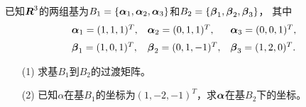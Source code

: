 \begin{frame}
  
    \begin{li}
      已知$\boldsymbol{R}^3$的两组基为$B_1=\{\boldsymbol{\alpha}_1,\boldsymbol{\alpha}_2,\boldsymbol{\alpha}_3\}$和$B_2=\{\boldsymbol{\beta}_1,\boldsymbol{\beta}_2,\boldsymbol{\beta}_3\}$，
      其中
      $$
      \begin{array}{lll}
        \boldsymbol{\alpha}_1=(1,1,1)^T,&\boldsymbol{\alpha}_2=(0,1,1)^T,&\boldsymbol{\alpha}_3=(0,0,1)^T, \\[0.2cm]
        \boldsymbol{\beta}_1=(1,0,1)^T,&\boldsymbol{\beta}_2=(0,1,-1)^T,&\boldsymbol{\beta}_3=(1,2,0)^T.  
      \end{array}
      $$
      \begin{itemize}
      \item[(1)] 求基$B_1$到$B_2$的过渡矩阵。
      \item[(2)] 已知$\alpha$在基$B_1$的坐标为$(1,-2,-1)^T$，求$\boldsymbol{\alpha}$在基$B_2$下的坐标。
      \end{itemize}      
    \end{li}
  
\end{frame}


